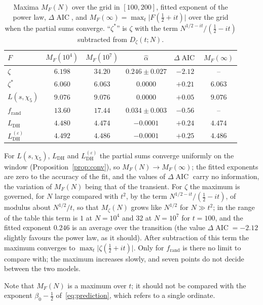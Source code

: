 \documentclass[11pt]{amsart}
\theoremstyle{definition}
\theoremstyle{remark}
\renewcommand{\DH}{\mathrm{DH}}
\newcommand{\abs}[1]{\lvert #1 \rvert}
\DeclareMathOperator{\AIC}{AIC}
\begin{document}
\begin{table}[ht]
\centering
\caption{Maxima $M_F(N)$ over the grid in $[100,200]$, fitted exponent
  of the power law, $\Delta\AIC$, and
  $M_F(\infty)=\max_t\abs{F(\tfrac12+it)}$ over the grid when the partial
  sums converge.  ``$\zeta^\ast$'' is $\zeta$ with the term
  $N^{1/2-it}/(\tfrac12-it)$ subtracted from $D_\zeta(t;N)$.}
\label{tab:model-selection}
\begin{tabular}{@{}lccccc@{}}
\toprule
$F$ & $M_F(10^4)$ & $M_F(10^7)$ & $\hat\alpha$ & $\Delta\AIC$ & $M_F(\infty)$ \\
\midrule
$\zeta$ & $6.198$ & $34.20$ & $0.246\pm0.027$ & $-2.12$ & -- \\
$\zeta^\ast$ & $6.060$ & $6.063$ & $0.0000$ & $+0.21$ & $6.063$ \\
$L(s,\chi_5)$ & $9.076$ & $9.076$ & $0.0000$ & $+0.05$ & $9.076$ \\
$f_{\mathrm{rand}}$ & $13.60$ & $17.44$ & $0.034\pm0.003$ & $-0.56$ & -- \\
$L_{\DH}$ & $4.480$ & $4.474$ & $-0.0001$ & $+0.24$ & $4.474$ \\
$L_{\DH}^{(\varepsilon)}$ & $4.492$ & $4.486$ & $-0.0001$ & $+0.25$ & $4.486$ \\
\bottomrule
\end{tabular}
\end{table}

For $L(s,\chi_5)$, $L_{\DH}$ and $L_{\DH}^{(\varepsilon)}$ the partial sums
converge uniformly on the window (Proposition~\ref{prop:conv}), so
$M_F(N)\to M_F(\infty)$; the fitted exponents are zero to the accuracy of
the fit, and the values of $\Delta\AIC$ carry no information, the
variation of $M_F(N)$ being that of the transient.  For $\zeta$ the
maximum is governed, for $N$ large compared with $t^2$, by the term
$N^{1/2-it}/(\tfrac12-it)$, of modulus about $N^{1/2}/t$, so that $M_\zeta(N)$
grows like $N^{1/2}$ for $N\gg t^2$; in the range of the table this term is $1$ at
$N=10^4$ and $32$ at $N=10^7$ for $t=100$, and the fitted exponent $0.246$ is an
average over the transition (the value $\Delta\AIC=-2.12$ slightly favours
the power law, as it should).  After subtraction of this term the maximum
converges to $\max_t\abs{\zeta(\tfrac12+it)}$.  Only for
$f_{\mathrm{rand}}$ is there no limit to compare with; the maximum
increases slowly, and seven points do not decide between the two models.

Note that $M_F(N)$ is a maximum over $t$; it should not be compared with
the exponent $\beta_0-\tfrac12$ of~\eqref{eq:prediction}, which refers to
a single ordinate.
\end{document}
